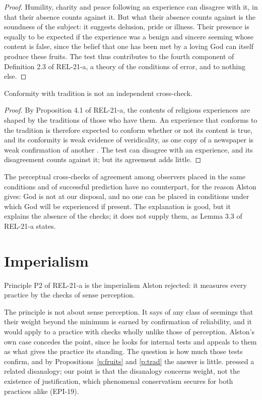 \documentclass{situationist-preprint}
\begin{document}
\begin{proof}
Humility, charity and peace following an experience can disagree with it, in that their absence counts against it. But what their absence counts against is the soundness of the subject: it suggests delusion, pride or illness. Their presence is equally to be expected if the experience was a benign and sincere seeming whose content is false, since the belief that one has been met by a loving God can itself produce these fruits. The test thus contributes to the fourth component of Definition 2.3 of REL-21-a, a theory of the conditions of error, and to nothing else.
\end{proof}

\begin{proposition}\label{p:trad}
Conformity with tradition is not an independent cross-check.
\end{proposition}

\begin{proof}
By Proposition 4.1 of REL-21-a, the contents of religious experiences are shaped by the traditions of those who have them. An experience that conforms to the tradition is therefore expected to conform whether or not its content is true, and its conformity is weak evidence of veridicality, as one copy of a newspaper is weak confirmation of another \citep[§265]{Wittgenstein1953}. The test can disagree with an experience, and its disagreement counts against it; but its agreement adds little.
\end{proof}

The perceptual cross-checks of agreement among observers placed in the same conditions and of successful prediction have no counterpart, for the reason Alston gives: God is not at our disposal, and no one can be placed in conditions under which God will be experienced if present. The explanation is good, but it explains the absence of the checks; it does not supply them, as Lemma 3.3 of REL-21-a states.

\section{Imperialism}

\begin{objection}
Principle P2 of REL-21-a is the imperialism Alston rejected: it measures every practice by the checks of sense perception.
\end{objection}

\begin{reply}
The principle is not about sense perception. It says of any class of seemings that their weight beyond the minimum is earned by confirmation of reliability, and it would apply to a practice with checks wholly unlike those of perception. Alston's own case concedes the point, since he looks for internal tests and appeals to them as what gives the practice its standing. The question is how much those tests confirm, and by Propositions~\ref{p:fruits} and \ref{p:trad} the answer is little. \citet{Gale1991} pressed a related disanalogy; our point is that the disanalogy concerns weight, not the existence of justification, which phenomenal conservatism secures for both practices alike (EPI-19).
\end{reply}
\end{document}
